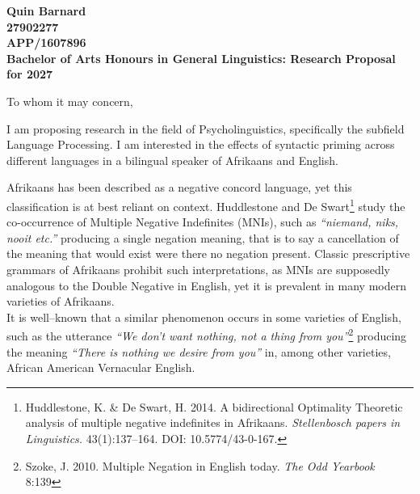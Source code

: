 \documentclass[12pt,a4paper]{article}
\begin{document}
    \textbf{Quin Barnard}\\
    \textbf{27902277}\\
    \textbf{APP/1607896}\\
    \textbf{Bachelor of Arts Honours in General Linguistics: Research Proposal for 2027}\par

To whom it may concern,

I am proposing research in the field of Psycholinguistics, specifically the subfield Language Processing. I am interested in the effects of syntactic priming across different languages in a bilingual speaker of Afrikaans and English.\par

Afrikaans has been described as a negative concord language, yet this classification is at best reliant on context. Huddlestone and De Swart\footnote{Huddlestone, K. \& De Swart, H. 2014. A bidirectional Optimality Theoretic analysis of multiple negative indefinites in Afrikaans. \textit{Stellenbosch papers in Linguistics.} 43(1):137–164. DOI: 10.5774/43-0-167.} study the co-occurrence of Multiple Negative Indefinites (MNIs), such as \textit{“niemand, niks, nooit etc.”} producing a single negation meaning, that is to say a cancellation of the meaning that would exist were there no negation present. Classic prescriptive grammars of Afrikaans prohibit such interpretations, as MNIs are supposedly analogous to the Double Negative in English, yet it is prevalent in many modern varieties of Afrikaans.\\
It is well–known that a similar phenomenon occurs in some varieties of English, such as the utterance \textit{“We don't want nothing, not a thing from you”}\footnote{Szoke, J. 2010. Multiple Negation in English today. \textit{The Odd Yearbook} 8:139} producing the meaning \textit{“There is nothing we desire from you”} in, among other varieties, African American Vernacular English.\par
\end{document}

